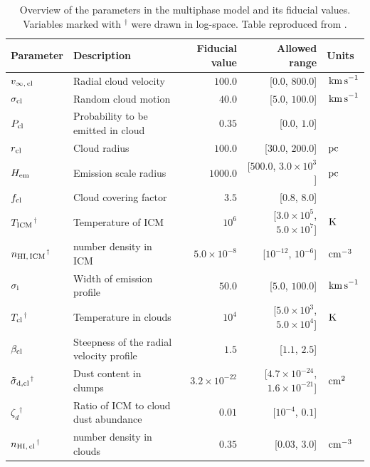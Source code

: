 \documentclass[a4paper,fleqn,usenatbib]{mnras}
\newcommand{\HI}{{\text{H\MakeUppercase{\romannumeral 1}}} }
\newcommand{\cm}{\ifmmode{{\rm cm}}\else cm\fi}
\begin{document}
\begin{table}
  \centering
\begin{tabular}{l|lrrl}
\hline
  Parameter  & Description & Fiducial value & Allowed range & Units \\ \hline\hline
$v_{\infty,\,{\rm cl}}$ & Radial cloud velocity & $100.0$ & [$0.0$, $800.0$] & $\,{\rm km\,s}^{-1}$ \\
$\sigma_{\rm {\rm cl}}$ & Random cloud motion &$40.0$ & [$5.0$, $100.0$] & $\,{\rm km\,s}^{-1}$ \\
$P_{\rm {\rm cl}}$ & Probability to be emitted in cloud & $0.35$ & [$0.0$, $1.0$] &  \\
$r_{\rm {\rm cl}}$ & Cloud radius & $100.0$ & [$30.0$, $200.0$] & $\,{\rm pc}$ \\
$H_{\rm em}$ & Emission scale radius & $1000.0$ & [$500.0$, $3.0\times 10^{3}$] & $\,{\rm pc}$ \\
$f_{\rm {\rm cl}}$ & Cloud covering factor & $3.5$ & [$0.8$, $8.0$] &  \\
$T_{\rm {\rm ICM}}$${}^{\dagger}$ & Temperature of ICM & $10^{6}$ & [$3.0\times 10^{5}$, $5.0\times 10^{7}$] & $\,{\rm K}$ \\
$n_{\rm HI,\,{\rm ICM}}$${}^{\dagger}$ & \HI number density in ICM & $5.0\times 10^{-8}$ & [$10^{-12}$, $10^{-6}$] & $\,{\rm cm}^{-3}$ \\
$\sigma_{\rm i}$ & Width of emission profile & $50.0$ & [$5.0$, $100.0$] & $\,{\rm km\,s}^{-1}$ \\
$T_{\rm {\rm cl}}$${}^{\dagger}$ & Temperature in clouds & $10^{4}$ & [$5.0\times 10^{3}$, $5.0\times 10^{4}$] & $\,{\rm K}$ \\
$\beta_{\rm cl}$ & Steepness of the radial velocity profile & $1.5$ & [$1.1$, $2.5$] &  \\
$\tilde\sigma_{\rm d, cl}$${}^{\dagger}$ & Dust content in clumps &
  $3.2\times10^{-22}$ & [$4.7\times 10^{-24}$, $1.6\times 10^{-21}$] &
  $\,\cm^{2}$ \\
$\zeta_d$${}^{\dagger}$ & Ratio of ICM to cloud dust abundance &
  $0.01$ & [$10^{-4}$, $0.1$] & \\
$n_{\rm HI,\,{\rm cl}}$${}^{\dagger}$ & \HI number density in
  clouds & $0.35$ & [$0.03$, $3.0$] & $\,{\rm cm}^{-3}$ \\
\hline
\end{tabular}
  \caption{Overview of the parameters in the multiphase model and its fiducial
    values. Variables marked with ${}^{\dagger}$ were drawn in
    log-space. Table reproduced from \citet{Gronke2016}.}
  \label{tab:models}
\end{table}
\end{document}
